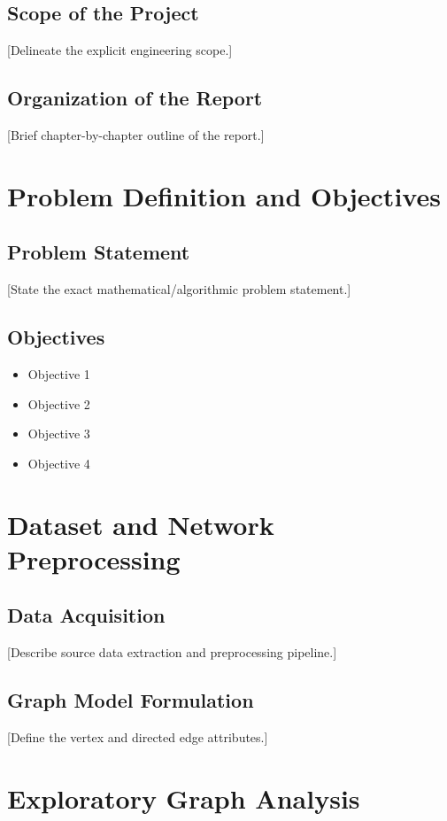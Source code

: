 \documentclass[12pt,a4paper]{report}
\begin{document}
\section{Scope of the Project}
[Delineate the explicit engineering scope.]

\section{Organization of the Report}
[Brief chapter-by-chapter outline of the report.]

\chapter{Problem Definition and Objectives}
\label{chap:problem}

\section{Problem Statement}
[State the exact mathematical/algorithmic problem statement.]

\section{Objectives}
\begin{itemize}
  \item Objective 1
  \item Objective 2
  \item Objective 3
  \item Objective 4
\end{itemize}

\chapter{Dataset and Network Preprocessing}
\label{chap:dataset}

\section{Data Acquisition}
[Describe source data extraction and preprocessing pipeline.]

\section{Graph Model Formulation}
[Define the vertex and directed edge attributes.]

\chapter{Exploratory Graph Analysis}
\label{chap:eda}
\end{document}
